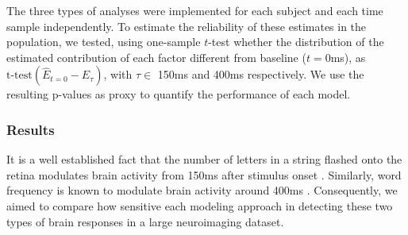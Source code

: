 The three types of analyses were implemented for each subject and each time
sample independently.  To estimate the reliability of these estimates in the
population, we tested, using one-sample $t$-test whether the distribution of
the estimated contribution of each factor different from baseline ($t=0$ms),
as $\text{t-test}(\hat E_{t=0} - \hat E_{\tau})$, with $\tau \in $ 150ms and
400ms respectively. We use the resulting p-values as proxy to quantify the
performance of each model.


\subsubsection{Results}
It is a well established fact that the number of letters in a string flashed
onto the retina modulates brain activity from 150ms after stimulus onset
\cite{pegado2014timing}. Similarly, word frequency is known to modulate brain
activity around 400ms \cite{kutas2011thirty}. Consequently, we aimed to compare
how sensitive each modeling approach in detecting these two types of brain
responses in a large neuroimaging dataset.

